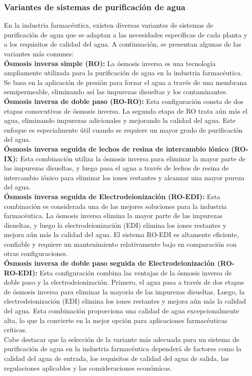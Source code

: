 \subsubsection{Variantes de sistemas de purificación de agua}

En la industria farmacéutica, existen diversas variantes de sistemas de purificación de agua que se adaptan a las necesidades específicas de cada planta y a los requisitos de calidad del agua. A continuación, se presentan algunas de las variantes más comunes:\\

\textbf{Ósmosis inversa simple (RO):} La ósmosis inversa es una tecnología ampliamente utilizada para la purificación de agua en la industria farmacéutica. Se basa en la aplicación de presión para forzar el agua a través de una membrana semipermeable, eliminando así las impurezas disueltas y los contaminantes.\\

\textbf{Ósmosis inversa de doble paso (RO-RO):} Esta configuración consta de dos etapas consecutivas de ósmosis inversa. La segunda etapa de RO trata aún más el agua, eliminando impurezas adicionales y mejorando la calidad del agua. Este enfoque es especialmente útil cuando se requiere un mayor grado de purificación del agua.\\

\textbf{Ósmosis inversa seguida de lechos de resina de intercambio iónico (RO-IX):} Esta combinación utiliza la ósmosis inversa para eliminar la mayor parte de las impurezas disueltas, y luego pasa el agua a través de lechos de resina de intercambio iónico para eliminar los iones restantes y alcanzar una mayor pureza del agua.\\

\textbf{Ósmosis inversa seguida de Electrodeionización (RO-EDI):} Esta combinación es considerada una de las mejores soluciones para la industria farmacéutica. La ósmosis inversa elimina la mayor parte de las impurezas disueltas, y luego la electrodeionización (EDI) elimina los iones restantes y mejora aún más la calidad del agua. El sistema RO-EDI es altamente eficiente, confiable y requiere un mantenimiento relativamente bajo en comparación con otras configuraciones.\\

\textbf{Ósmosis inversa de doble paso seguida de Electrodeionización (RO-RO-EDI):} Esta configuración combina las ventajas de la ósmosis inversa de doble paso y la electrodeionización. Primero, el agua pasa a través de dos etapas de ósmosis inversa para eliminar la mayoría de las impurezas disueltas. Luego, la electrodeionización (EDI) elimina los iones restantes y mejora aún más la calidad del agua. Esta combinación proporciona una calidad de agua excepcionalmente alta, lo que la convierte en la mejor opción para aplicaciones farmacéuticas críticas.\\


Cabe destacar que la selección de la variante más adecuada para un sistema de purificación de agua en la industria farmacéutica dependerá de factores como la calidad del agua de entrada, los requisitos de calidad del agua de salida, las regulaciones aplicables y las consideraciones económicas.
